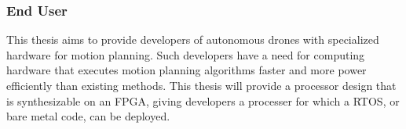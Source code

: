     \subsubsection*{End User}
    This thesis aims to provide developers of autonomous drones with specialized hardware for motion planning. Such developers have a need for computing hardware that executes motion planning algorithms faster and more power efficiently than existing methods. This thesis will provide a processor design that is synthesizable on an \gls{FPGA}, giving developers a processer for which a \gls{RTOS}, or bare metal code, can be deployed.
